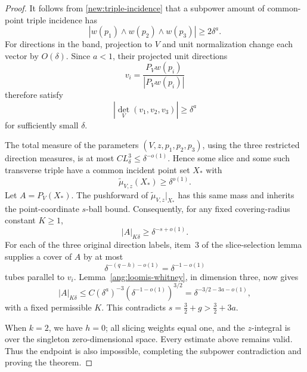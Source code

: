 \begin{proof}
It follows from \eqref{new:triple-incidence} that a subpower amount of common-point triple incidence has
\[
|w(p_1)\wedge w(p_2)\wedge w(p_3)|\ge2\delta^a.
\]
For directions in the band, projection to \(V\) and unit normalization change each vector by \(O(\delta)\). Since \(a<1\), their projected unit directions
\[
v_i=\frac{P_Vw(p_i)}{|P_Vw(p_i)|}
\]
therefore satisfy
\[
|\det_V(v_1,v_2,v_3)|\ge\delta^a
\]
for sufficiently small \(\delta\).

The total measure of the parameters \((V,z,p_1,p_2,p_3)\), using the three restricted direction measures, is at most
\(C L_\delta^3\le\delta^{-o(1)}\). Hence some slice and some such transverse triple have a common incident point set \(X_*\) with
\[
\widetilde\mu_{V,z}(X_*)\ge\delta^{o(1)}.
\]
Let \(A=P_V(X_*)\). The pushforward of
\(\widetilde\mu_{V,z}|_{X_*}\) has this same mass and inherits the point-coordinate \(s\)-ball bound. Consequently, for any fixed covering-radius constant \(K\ge1\),
\[
|A|_{K\delta}\ge\delta^{-s+o(1)}.
\]
For each of the three original direction labels, item~3 of the slice-selection lemma supplies a cover of \(A\) by at most
\[
\delta^{-(q-h)-o(1)}=\delta^{-1-o(1)}
\]
tubes parallel to \(v_i\). Lemma~\ref{ang:loomis-whitney}, in dimension three, now gives
\[
|A|_{K\delta}\le
C(\delta^a)^{-3}
\left(\delta^{-1-o(1)}\right)^{3/2}
=\delta^{-3/2-3a-o(1)},
\]
with a fixed permissible \(K\). This contradicts
\(s=\tfrac32+g>\tfrac32+3a\).

When \(k=2\), we have \(h=0\); all slicing weights equal one, and the \(z\)-integral is over the singleton zero-dimensional space. Every estimate above remains valid. Thus the endpoint is also impossible, completing the subpower contradiction and proving the theorem.
\end{proof}
